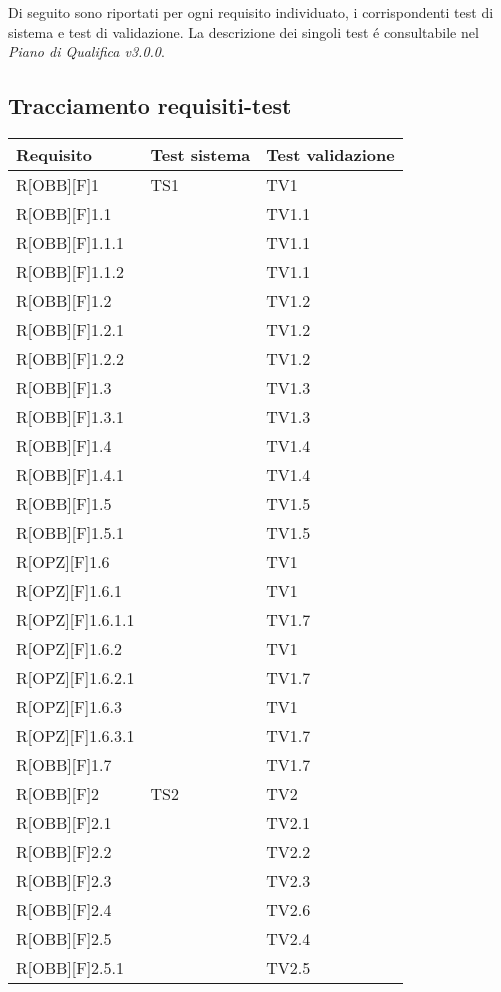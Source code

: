 Di seguito sono riportati per ogni requisito individuato, i corrispondenti test di sistema e test di validazione. La descrizione dei singoli test é consultabile nel \textit{Piano di Qualifica v3.0.0}.
\subsection{Tracciamento requisiti-test}
	\begin{table}[h]
		\begin{tabular}{|p{}|p{}|p{}|}
			\toprule
			
			\textbf{Requisito} & \textbf{Test sistema} & \textbf{Test validazione} \\
			
			\midrule

			R[OBB][F]1 & TS1 & TV1 \\ \midrule
			R[OBB][F]1.1 &  & TV1.1 \\ \midrule
			R[OBB][F]1.1.1 &  & TV1.1 \\ \midrule
			R[OBB][F]1.1.2 &  & TV1.1 \\ \midrule
			R[OBB][F]1.2 &  & TV1.2 \\ \midrule
			R[OBB][F]1.2.1 &  & TV1.2 \\ \midrule
			R[OBB][F]1.2.2 &  & TV1.2 \\ \midrule
			R[OBB][F]1.3 &  & TV1.3 \\ \midrule
			R[OBB][F]1.3.1 &  & TV1.3 \\ \midrule
			R[OBB][F]1.4 &  & TV1.4 \\ \midrule
			R[OBB][F]1.4.1 &  & TV1.4 \\ \midrule
			R[OBB][F]1.5 &  & TV1.5 \\ \midrule
			R[OBB][F]1.5.1 &  & TV1.5 \\ \midrule
			R[OPZ][F]1.6 &  & TV1 \\ \midrule
			R[OPZ][F]1.6.1 &  & TV1 \\ \midrule
			R[OPZ][F]1.6.1.1 &  & TV1.7 \\ \midrule
			R[OPZ][F]1.6.2 &  & TV1 \\ \midrule
			R[OPZ][F]1.6.2.1 &  & TV1.7 \\ \midrule
			R[OPZ][F]1.6.3 &  & TV1 \\ \midrule
			R[OPZ][F]1.6.3.1 &  & TV1.7 \\ \midrule
			R[OBB][F]1.7 &  & TV1.7 \\ \midrule
			R[OBB][F]2 & TS2 & TV2 \\ \midrule
			R[OBB][F]2.1 &  & TV2.1 \\ \midrule
			R[OBB][F]2.2 &  & TV2.2 \\ \midrule
			R[OBB][F]2.3 &  & TV2.3 \\ \midrule
			R[OBB][F]2.4 &  & TV2.6 \\ \midrule
			R[OBB][F]2.5 &  & TV2.4 \\ \midrule
			R[OBB][F]2.5.1 &  & TV2.5 \\ \midrule
	
	\end{tabular}
	\end{table}
	\newpage
	
